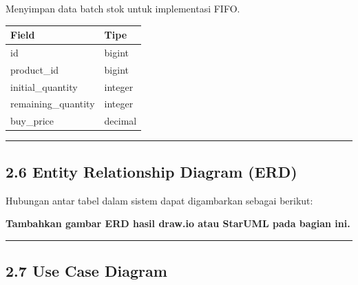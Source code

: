 Menyimpan data batch stok untuk implementasi FIFO.

{\def\LTcaptype{none} %
\begin{longtable}[]{@{}ll@{}}
\toprule\noalign{}
Field & Tipe \\
\midrule\noalign{}
\endhead
\bottomrule\noalign{}
\endlastfoot
id & bigint \\
product\_id & bigint \\
initial\_quantity & integer \\
remaining\_quantity & integer \\
buy\_price & decimal \\
\end{longtable}
}

\begin{center}\rule{0.5\linewidth}{0.5pt}\end{center}

\subsection{2.6 Entity Relationship Diagram (ERD)}\label{entity-relationship-diagram-erd}

Hubungan antar tabel dalam sistem dapat digambarkan sebagai berikut:

\begin{Shaded}
\begin{Highlighting}[]

\end{Highlighting}
\end{Shaded}

\textbf{Tambahkan gambar ERD hasil draw.io atau StarUML pada bagian ini.}

\begin{center}\rule{0.5\linewidth}{0.5pt}\end{center}

\subsection{2.7 Use Case Diagram}\label{use-case-diagram}

